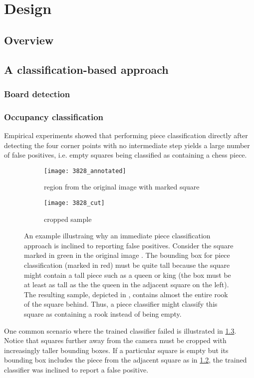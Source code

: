 \documentclass[../main.tex]{subfiles}
\begin{document}
\chapter{Design}
\section{Overview}


\section{A classification-based approach}
\subsection{Board detection}
\subsection{Occupancy classification}
Empirical experiments showed that performing piece classification directly after detecting the four corner points with no intermediate step yields a large number of false positives, i.e. empty squares being classified as containing a chess piece.
\begin{figure}
    \centering
    \begin{subfigure}[b]{0.65\textwidth}
        \centering
        \texttt{[image: 3828\_annotated]}
        \caption{region from the original image with marked square}
        \label{fig:occupancy_classification_fp_original}
    \end{subfigure}
    \hfill
    \begin{subfigure}[b]{0.3\textwidth}
        \centering
        \texttt{[image: 3828\_cut]}
        \caption{cropped sample}
        \label{fig:occupancy_classification_fp_cropped}
    \end{subfigure}
    \caption[An example illustraing why an immediate piece classification approach is inclined to reporting false positives.]{An example illustraing why an immediate piece classification approach is inclined to reporting false positives. Consider the square marked in green in the original image . The bounding box for piece classification (marked in red) must be quite tall because the square might contain a tall piece such as a queen or king (the box must be at least as tall as the the queen in the adjacent square on the left). The resulting sample, depicted in , contains almost the entire rook of the square behind. Thus, a piece classifier might classify this square as containing a rook instead of being empty.}
    \label{fig:occupancy_classification_fp}
\end{figure}
One common scenario where the trained classifier failed is illustrated in \cref{fig:occupancy_classification_fp}.
Notice that squares further away from the camera must be cropped with increasingly taller bounding boxes.
If a particular square is empty but its bounding box includes the piece from the adjacent square as in \cref{fig:occupancy_classification_fp_cropped}, the trained classifier was inclined to report a false positive.
\end{document}
